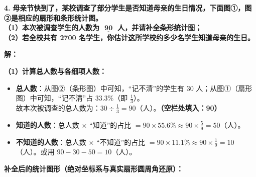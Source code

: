 \vspace{0.6cm}

\textbf{\LARGE 4.} \textbf{母亲节快到了，某校调查了部分学生是否知道母亲的生日情况，下面图①，图②是相应的扇形和条形统计图。\\
（1）本次被调查学生的人数为 $\underline{\textbf{    90    }}$ 人，并请补全条形统计图；\\
（2）若全校共有 2700 名学生，你估计这所学校约多少名学生知道母亲的生日。}

\vspace{0.4cm}
\textbf{解：}

\textbf{（1）计算总人数与各细项人数：}
\begin{itemize}
    \item \textbf{总人数}：从图②（条形图）中可知，“记不清”的学生有 $30$ 人；从图①（扇形图）中可知，“记不清”占 $33.3\%$（即 $\frac{1}{3}$）。\\
    故本次被调查的总人数为：$30 \div \frac{1}{3} = 90$（人）。\textbf{（空栏处填入：90）}
    \item \textbf{知道的人数}：总人数 $\times$ “知道”的占比 $= 90 \times 55.6\% \approx 90 \times \frac{5}{9} = 50$（人）。
    \item \textbf{不知道的人数}：总人数 $\times$ “不知道”的占比 $= 90 \times 11.1\% \approx 90 \times \frac{1}{9} = 10$（人）。或用 $90 - 30 - 50 = 10$（人）。
\end{itemize}

\textbf{补全后的统计图形（绝对坐标系与真实扇形圆周角还原）：}

